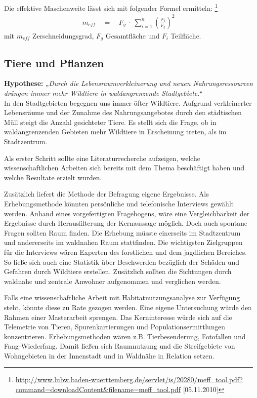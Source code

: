 \documentclass[12pt]{article}
\newcommand{\citefooturldate}[2]{\footnote{\url{#1} [#2]}}
\begin{document}
Die effektive Maschenweite lässt sich mit folgender Formel ermitteln:
\citefooturldate{http://www.lubw.baden-wuerttemberg.de/servlet/is/20280/meff_tool.pdf?command=downloadContent&filename=meff_tool.pdf}{05.11.2010}
\begin{align*}
 m_{eff} \quad = \quad F_g ~ \cdot ~ \sum\limits_{i=1}^{n}\left(\frac{F_i}{F_g}\right)^2
\end{align*}
mit $m_{eff}$ Zerschneidungsgrad, $F_g$ Gesamtfläche und $F_i$ Teilfläche.

\subsection{Tiere und Pflanzen}

\textbf{Hypothese:} \textit{„Durch die Lebensraumverkleinerung und neuen Nahrungsressourcen \\ drängen immer mehr Wildtiere in waldangrenzende 
            Stadtgebiete.“} \\ 

\noindent In den Stadtgebieten begegnen uns immer öfter Wildtiere. Aufgrund verkleinerter Lebensräume und der Zunahme 
des Nahrungsangebotes durch den städtischen Müll steigt die Anzahl gesichteter Tiere. Es stellt sich die Frage, ob 
in waldangrenzenden Gebieten mehr Wildtiere in Erscheinung treten, als im Stadtzentrum.

Als erster Schritt sollte eine Literaturrecherche aufzeigen, welche wissenschaftlichen Arbeiten sich bereits
mit dem Thema beschäftigt haben und welche Resultate erzielt wurden. 

Zusätzlich liefert die Methode der Befragung eigene Ergebnisse. Als 
Erhebungsmethode könnten persönliche und telefonische Interviews gewählt werden.
Anhand eines vorgefertigten Fragebogens, wäre eine Vergleichbarkeit der Ergebnisse durch Herausfilterung
der Kernaussage möglich. Doch auch spontane Fragen sollten Raum finden.
Die Erhebung müsste einerseits im Stadtzentrum und andererseits im waldnahen Raum stattfinden. 
Die wichtigsten Zielgruppen für die Interviews wären Experten des forstlichen und dem jagdlichen Bereiches.
So ließe sich auch eine Statistik über Beschwerden bezüglich der Schäden und Gefahren durch Wildtiere erstellen. 
Zusätzlich sollten die Sichtungen durch waldnahe und zentrale 
Anwohner aufgenommen und verglichen werden.

Falls eine wissenschaftliche Arbeit mit Habitatnutzungsanalyse zur Verfügung steht, könnte diese zu Rate gezogen werden.
Eine eigene Untersuchung würde den Rahmen einer Masterarbeit sprengen. 
Das Kerninteresse würde sich auf die Telemetrie von Tieren, Spurenkartierungen 
und Populationsermittlungen konzentrieren. Erhebungsmethoden wären z.B. Tierbesenderung, Fotofallen und Fang-Wiederfang. 
Damit ließen sich Raumnutzung und die Streifgebiete von Wohngebieten in der Innenstadt und 
in Waldnähe in Relation setzen. \\
\end{document}
